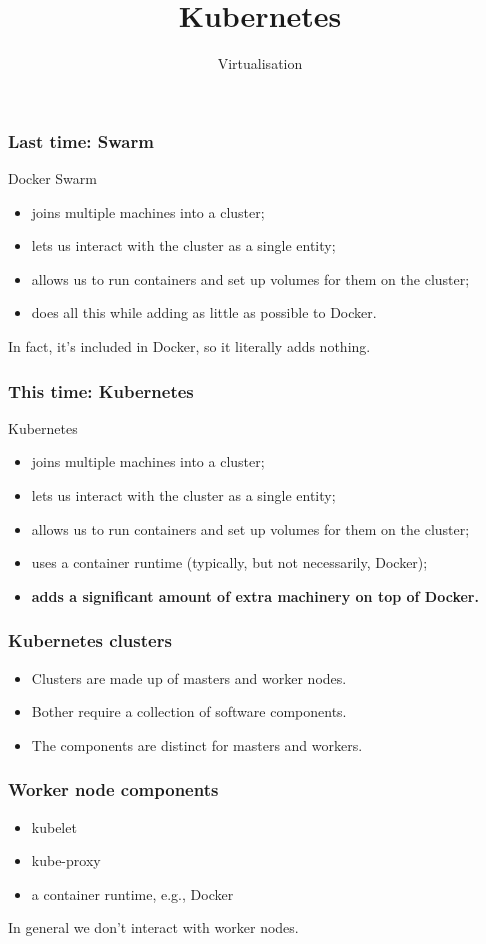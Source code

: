 \documentclass[10pt]{beamer}
\title{Kubernetes}
\author[I720]{Virtualisation}
\institute[Otago Polytechnic]{
  Otago Polytechnic \\
  Dunedin, New Zealand \\
}
\date{}
\begin{document}
\begin{frame}[plain]
  \titlepage
\end{frame}

\begin{frame}
  \frametitle{Last time: Swarm}
  Docker Swarm
  \begin{itemize}
    \item joins multiple machines into a cluster;
    \item lets us interact with the cluster as a single entity;
    \item allows us to run containers and set up volumes for them on the cluster;
    \item does all this while adding as little as possible to Docker.
  \end{itemize}
  
  In fact, it's included in Docker, so it literally adds nothing.
\end{frame}

\begin{frame}
  \frametitle{This time: Kubernetes}
  Kubernetes 
  \begin{itemize}
    \item joins multiple machines into a cluster;
    \item lets us interact with the cluster as a single entity;
    \item allows us to run containers and set up volumes for them on the cluster;
    \item uses a container runtime (typically, but not necessarily, Docker);
    \item \textbf{adds a significant amount of extra machinery on top of Docker.}
  \end{itemize}
\end{frame}

\begin{frame}
  \frametitle{Kubernetes clusters}
  
  \begin{itemize}
    \item Clusters are made up of masters and worker nodes.
    \item Bother require a collection of software components.
    \item The components are distinct for masters and workers.
  \end{itemize}
\end{frame}

\begin{frame}
  \frametitle{Worker node components}
  
  \begin{itemize}
    \item kubelet
    \item kube-proxy
    \item a container runtime, e.g., Docker
  \end{itemize}
  
  In general we don't interact with worker nodes.
\end{frame}
\end{document}
